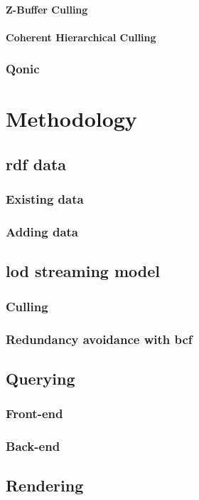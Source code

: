 \documentclass[12pt,a4paper,faculty=ea,language=en,doctype=report]{ugent-doc}
\begin{document}
      \subsubsection{Z-Buffer Culling}
      \subsubsection{Coherent Hierarchical Culling}
    \subsection{Qonic}

\chapter{Methodology}
  \section{\acs{rdf} data}
    \subsection{Existing data}
    \subsection{Adding data}
  \section{\acs{lod} streaming model}  
    \subsection{Culling}
    \subsection{Redundancy avoidance with \acs{bcf}}
  \section{Querying}
    \subsection{Front-end}
    \subsection{Back-end}
  \section{Rendering}
\end{document}
